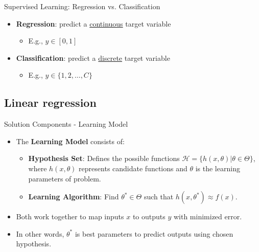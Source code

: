 \documentclass[serif, aspectratio=169]{beamer}
\begin{document}
\begin{frame}{Supervised Learning: Regression vs. Classification}

    \begin{itemize}
        \item \textbf{Regression}: predict a \underline{continuous} target variable
        \begin{itemize}
            \item E.g., $y \in [0, 1]$
        \end{itemize}
        \item \textbf{Classification}: predict a \underline{discrete} target variable
        \begin{itemize}
            \item E.g., $y \in \{1, 2, \ldots, C\}$
        \end{itemize}
    \end{itemize}

\end{frame}



\subsection{Linear regression}
\begin{frame}{Solution Components - Learning Model}
    \begin{itemize}
        \item The \textbf{Learning Model} consists of:
        \begin{itemize}
            \item \textbf{Hypothesis Set}: Defines the possible functions \( \mathcal{H} = \{h(x, \theta) | \theta \in \Theta\} \), where \( h(x, \theta) \) represents candidate functions and \( \theta \) is the learning parameters of problem.
            \item \textbf{Learning Algorithm}: Find \( \theta^* \in \Theta \) such that \( h(x, \theta^*) \approx f(x) \).
        \end{itemize}
        \item Both work together to map inputs \(x\) to outputs \(y\) with minimized error.
        \item In other words, \( \theta^* \) is best parameters to predict outputs using chosen hypothesis.
    \end{itemize}
    \vspace{0.5cm}
\end{frame}
\end{document}
